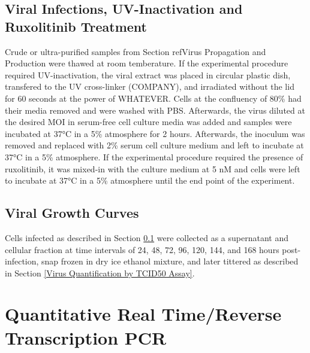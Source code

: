 \subsection{Viral Infections, UV-Inactivation and Ruxolitinib Treatment} \label{Viral Infections, UV-Inactivation and Ruxolitinib Treatment}
Crude or ultra-purified samples from Section ref{Virus Propagation and Production} were thawed at room temberature. If the experimental procedure required UV-inactivation, the viral extract was placed in circular plastic dish, transfered to the UV cross-linker (COMPANY), and irradiated without the lid for 60 seconds at the power of WHATEVER. Cells at the confluency of 80\% had their media removed and were washed with PBS. Afterwards, the virus diluted at the desired MOI in serum-free cell culture media was added and samples were incubated at 37°C in a 5\%  atmosphere for 2 hours. Afterwards, the inoculum was removed and replaced with 2\% serum cell culture medium and left to incubate at 37°C in a 5\%  atmosphere. If the experimental procedure required the presence of ruxolitinib, it was mixed-in with the culture medium at 5 nM and cells were left to incubate at 37°C in a 5\%  atmosphere until the end point of the experiment.




\subsection{Viral Growth Curves} \label{Viral Growth Curves}
Cells infected as described in Section \ref{Viral Infections, UV-Inactivation and Ruxolitinib Treatment} were collected as a supernatant and cellular fraction at time intervals of 24, 48, 72, 96, 120, 144, and 168 hours post-infection, snap frozen in dry ice ethanol mixture, and later tittered as described in Section \ref{Virus Quantification by TCID50 Assay}.




\section{Quantitative Real Time/Reverse Transcription PCR} \label{Quantitative Real Time/Reverse Transcription PCR}
